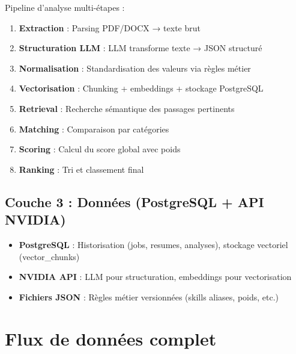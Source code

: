 \documentclass[12pt,a4paper,oneside]{book}
\begin{document}
Pipeline d'analyse multi-étapes :
\begin{enumerate}
    \item \textbf{Extraction} : Parsing PDF/DOCX → texte brut
    \item \textbf{Structuration LLM} : LLM transforme texte → JSON structuré
    \item \textbf{Normalisation} : Standardisation des valeurs via règles métier
    \item \textbf{Vectorisation} : Chunking + embeddings + stockage PostgreSQL
    \item \textbf{Retrieval} : Recherche sémantique des passages pertinents
    \item \textbf{Matching} : Comparaison par catégories
    \item \textbf{Scoring} : Calcul du score global avec poids
    \item \textbf{Ranking} : Tri et classement final
\end{enumerate}

\subsection{Couche 3 : Données (PostgreSQL + API NVIDIA)}

\begin{itemize}
    \item \textbf{PostgreSQL} : Historisation (jobs, resumes, analyses), stockage vectoriel (vector\_chunks)
    \item \textbf{NVIDIA API} : LLM pour structuration, embeddings pour vectorisation
    \item \textbf{Fichiers JSON} : Règles métier versionnées (skills aliases, poids, etc.)
\end{itemize}

\section{Flux de données complet}
\end{document}

